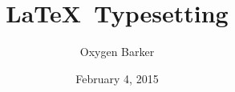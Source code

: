 \documentclass[12pt,a4paper]{article}
\begin{document}
\title{\LaTeX\ Typesetting}
\author{Oxygen Barker}
\date{February 4, 2015}

\maketitle
	
\end{document}
